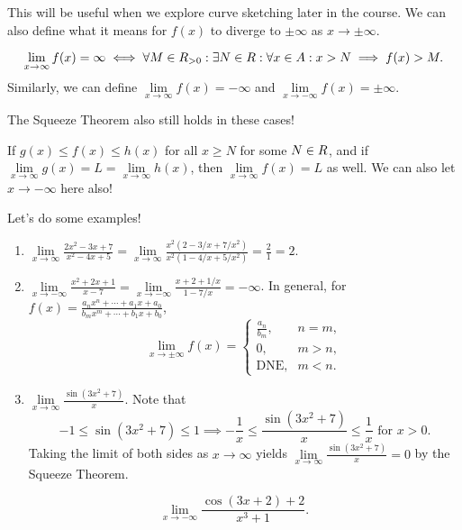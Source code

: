This will be useful when we explore curve sketching later in the course. We can also define what it means for $ f(x) $
to diverge to $ \pm \infty $ as $ x\to\pm\infty $.
\begin{Definition}{}{}
    \[ \lim\limits_{{x} \to {\infty}}f(x)=\infty\iff
        \forall M\in\relax{R}_{>0}:\exists N\in\relax{R}:\forall x\in A:x>N\implies f(x)>M. \]
    Similarly, we can define $ \lim\limits_{{x} \to {\infty}}f(x)=-\infty $ and $ \lim\limits_{{x} \to {-\infty}}f(x)=\pm \infty $.
\end{Definition}
The Squeeze Theorem also still holds in these cases!
\begin{Theorem}{}{}
    If $ g(x)\le f(x)\le h(x) $ for all $ x\ge N $ for some $ N\in\relax{R} $, and if $ \lim\limits_{{x} \to {\infty}}g(x)=L=\lim\limits_{{x} \to {\infty}}h(x) $,
    then $ \lim\limits_{{x} \to {\infty}}f(x)=L $ as well. We can also let $ x\to-\infty $ here also!
\end{Theorem}
Let's do some examples!
\begin{Example}{}{}
    \begin{enumerate}[(1)]
        \item $ \displaystyle \lim\limits_{{x} \to {\infty}}\frac{2x^2-3x+7}{x^2-4x+5}=\lim\limits_{{x} \to {\infty}}\frac{x^2(2-3/x+7/x^2)}{x^2(1-4/x+5/x^2)}=\frac{2}{1}=2 $.
        \item $ \displaystyle \lim\limits_{{x} \to {-\infty}}\frac{x^2+2x+1}{x-7}=\lim\limits_{{x} \to {-\infty}}\frac{x+2+1/x}{1-7/x}=-\infty $.
              In general, for $ f(x)=\frac{a_n x^n+\cdots+a_1 x+a_0}{b_m x^m+\cdots+b_1x+b_0} $,
              \[ \lim\limits_{{x} \to {\pm\infty}}f(x)=\begin{cases}
                      \frac{a_n}{b_m}, & n=m, \\
                      0,               & m>n, \\
                      \text{DNE},      & m<n.
                  \end{cases} \]
        \item $ \displaystyle \lim\limits_{{x} \to {\infty}}\frac{\sin(3x^2+7)}{x} $. Note that
              \[ -1\le \sin(3x^2+7)\le 1\implies -\frac{1}{x}\le \frac{\sin(3x^2+7)}{x}\le \frac{1}{x}\text{ for $x>0$}. \]
              Taking the limit of both sides as $ x\to\infty $ yields $ \lim\limits_{{x} \to {\infty}}\frac{\sin(3x^2+7)}{x}=0 $
              by the Squeeze Theorem.
    \end{enumerate}
\end{Example}
\begin{Exercise}{}{}
    \[ \lim\limits_{{x} \to {-\infty}}\frac{\cos(3x+2)+2}{x^3+1}. \]
\end{Exercise}

